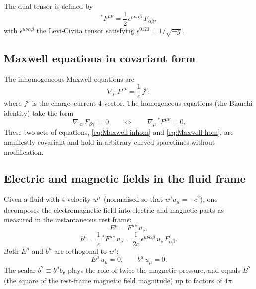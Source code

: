 The dual tensor is defined by
\begin{equation}
  {}^{\ast}\!F^{\mu\nu}
  = \frac{1}{2}\,\epsilon^{\mu\nu\alpha\beta}\,F_{\alpha\beta},
  \label{eq:dual-Faraday}
\end{equation}
with $\epsilon^{\mu\nu\alpha\beta}$ the Levi-Civita tensor satisfying
$\epsilon^{0123} = 1/\!\sqrt{-g}$.

\subsection{Maxwell equations in covariant form}

The inhomogeneous Maxwell equations are
\begin{equation}
  \nabla_{\mu}\,F^{\mu\nu} = \frac{1}{c}\,j^{\nu},
  \label{eq:Maxwell-inhom}
\end{equation}
where $j^{\nu}$ is the charge--current 4-vector.  The homogeneous
equations (the Bianchi identity) take the form
\begin{equation}
  \nabla_{[\alpha}\,F_{\beta\gamma]} = 0
  \qquad\Longleftrightarrow\qquad
  \nabla_{\mu}\,{}^{\ast}\!F^{\mu\nu} = 0.
  \label{eq:Maxwell-hom}
\end{equation}
These two sets of equations, \eqref{eq:Maxwell-inhom} and
\eqref{eq:Maxwell-hom}, are manifestly covariant and hold in arbitrary
curved spacetimes without modification.

\subsection{Electric and magnetic fields in the fluid frame}

Given a fluid with 4-velocity $u^{\mu}$ (normalised so that
$u^{\mu}u_{\mu}=-c^{2}$), one decomposes the electromagnetic field into
electric and magnetic parts as measured in the instantaneous rest frame:
\begin{equation}
  E^{\mu} = F^{\mu\nu}\,u_{\nu},
  \label{eq:Emu-def}
\end{equation}
\begin{equation}
  b^{\mu} = \frac{1}{c}\,{}^{\ast}\!F^{\mu\nu}\,u_{\nu}
  = \frac{1}{2c}\,\epsilon^{\mu\nu\alpha\beta}\,u_{\nu}\,F_{\alpha\beta}.
  \label{eq:bmu-def}
\end{equation}
Both $E^{\mu}$ and $b^{\mu}$ are orthogonal to $u^{\mu}$:
\begin{equation}
  E^{\mu}\,u_{\mu} = 0, \qquad b^{\mu}\,u_{\mu} = 0.
  \label{eq:E-b-orthogonal}
\end{equation}
The scalar $b^{2}\equiv b^{\mu}b_{\mu}$ plays the role of twice the
magnetic pressure, and equals $B^{2}$ (the square of the rest-frame
magnetic field magnitude) up to factors of $4\pi$.

